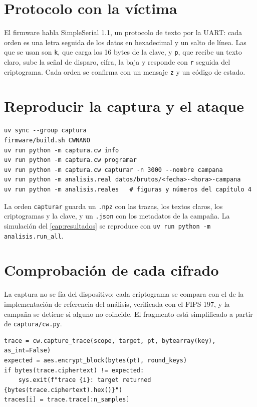 \section{Protocolo con la víctima}

El firmware habla SimpleSerial 1.1, un protocolo de texto por la UART: cada
orden es una letra seguida de los datos en hexadecimal y un salto de línea. Las
que se usan son \texttt{k}, que carga los 16 bytes de la clave, y \texttt{p},
que recibe un texto claro, sube la señal de disparo, cifra, la baja y responde
con \texttt{r} seguida del criptograma. Cada orden se confirma con un mensaje
\texttt{z} y un código de estado.

\section{Reproducir la captura y el ataque}

\begin{lstlisting}[style=bash]
uv sync --group captura
firmware/build.sh CWNANO
uv run python -m captura.cw info
uv run python -m captura.cw programar
uv run python -m captura.cw capturar -n 3000 --nombre campana
uv run python -m analisis.real datos/brutos/<fecha>-<hora>-campana
uv run python -m analisis.reales   # figuras y números del capítulo 4
\end{lstlisting}

La orden \texttt{capturar} guarda un \texttt{.npz} con las trazas, los textos
claros, los criptogramas y la clave, y un \texttt{.json} con los metadatos de
la campaña. La simulación del \cref{cap:resultados} se reproduce con
\texttt{uv run python -m analisis.run\_all}.

\section{Comprobación de cada cifrado}

La captura no se fía del dispositivo: cada criptograma se compara con el de la
implementación de referencia del análisis, verificada con el FIPS-197, y la
campaña se detiene si alguno no coincide. El fragmento está simplificado a
partir de \texttt{captura/cw.py}.

\begin{lstlisting}[style=python]
trace = cw.capture_trace(scope, target, pt, bytearray(key), as_int=False)
expected = aes.encrypt_block(bytes(pt), round_keys)
if bytes(trace.ciphertext) != expected:
    sys.exit(f"trace {i}: target returned {bytes(trace.ciphertext).hex()}")
traces[i] = trace.trace[:n_samples]
\end{lstlisting}

